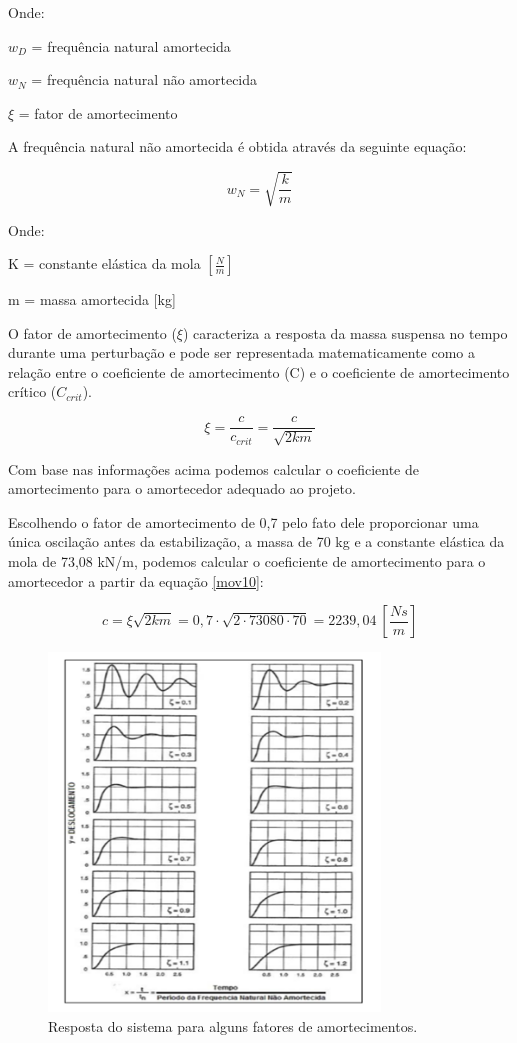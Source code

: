 Onde: 

\noindent $w_D$ = frequência natural amortecida

\noindent $w_N$ = frequência natural não amortecida

\noindent $\xi$ = fator de amortecimento

A frequência natural não amortecida é obtida através da seguinte equação:

\begin{equation} \label{mov9}
w_N = \sqrt{\frac{k}{m}}
\end{equation} 

Onde:

\noindent K = constante elástica da mola $\left[\frac{N}{m}\right]\ $

\noindent m = massa amortecida [kg]

O fator de amortecimento ($\xi$) caracteriza a resposta da massa suspensa no tempo durante uma perturbação e pode ser representada matematicamente como a relação entre o coeficiente de amortecimento (C) e o coeficiente de amortecimento crítico ($C_{crit}$).

\begin{equation} \label{mov10}
\xi =\frac{c}{c_{crit}}=\frac{c}{\sqrt{2km}} 
\end{equation} 

Com base nas informações acima podemos calcular o coeficiente de amortecimento para o amortecedor adequado ao projeto.

Escolhendo o fator de amortecimento de 0,7 pelo fato dele proporcionar uma única oscilação antes da estabilização, a massa de 70 kg e a constante elástica da mola de 73,08 kN/m, podemos calcular o coeficiente de amortecimento para o amortecedor a partir da equação \eqref{mov10}:

\[c = \xi \sqrt{2km} = 0,7 \cdot \sqrt{2 \cdot 73080 \cdot 70} = 2239,04 \ \left[ \frac{Ns}{m} \right] \]

\begin{figure}[H]
	\centering
	\includegraphics[width=250pt]{figuras/deslocamento_amortecido.png}
	\caption{Resposta do sistema para alguns fatores de amortecimentos.}
\end{figure}

